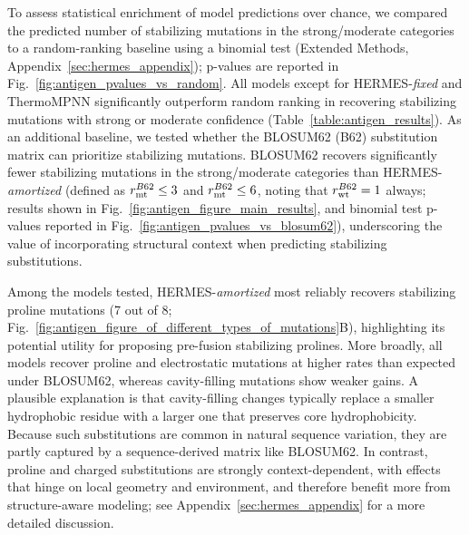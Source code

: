 To assess statistical enrichment of model predictions over chance, we compared the predicted number
of stabilizing mutations in the strong/moderate categories to a random-ranking baseline using a
binomial test (Extended Methods, Appendix~\ref{sec:hermes_appendix}); p-values are reported in
Fig.~\ref{fig:antigen_pvalues_vs_random}. All models except for HERMES-{\em fixed} and ThermoMPNN
significantly outperform random ranking in
recovering stabilizing mutations with strong or moderate confidence
({Table~\ref{table:antigen_results}}).
As an additional baseline, we tested whether the BLOSUM62 (B62) substitution matrix can prioritize
stabilizing mutations. BLOSUM62 recovers significantly fewer stabilizing mutations in the
strong/moderate categories than HERMES-\emph{amortized} (defined as $r_{\text{mt}}^{B62} \leq 3$ and
$r_{\text{mt}}^{B62} \leq 6$, noting that $r_{\text{wt}}^{B62} = 1$ always; {results shown in
Fig.~\ref{fig:antigen_figure_main_results},} and binomial test p-values reported in
Fig.~\ref{fig:antigen_pvalues_vs_blosum62}), underscoring the value of incorporating structural
context when predicting stabilizing substitutions.

Among the models tested, HERMES-\emph{amortized} most reliably recovers stabilizing proline
mutations (7 out of 8; Fig.~\ref{fig:antigen_figure_of_different_types_of_mutations}B), highlighting
its potential utility for proposing pre-fusion stabilizing prolines. More broadly, all models
recover proline and electrostatic mutations at higher rates than expected under BLOSUM62, whereas
cavity-filling mutations show weaker gains. A plausible explanation is that cavity-filling changes
typically replace a smaller hydrophobic residue with a larger one that preserves core
hydrophobicity. Because such substitutions are common in natural sequence variation, they are partly
captured by a sequence-derived matrix like BLOSUM62. In contrast, proline and charged substitutions
are strongly context-dependent, with effects that hinge on local geometry and environment, and
therefore benefit more from structure-aware modeling; see Appendix~\ref{sec:hermes_appendix} for a more detailed discussion.

